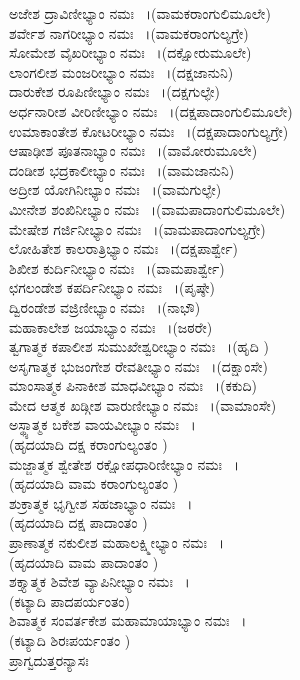   ಅಜೇಶ ದ್ರಾವಿಣೀಭ್ಯಾಂ ನಮಃ  ~।(ವಾಮಕರಾಂಗುಲಿಮೂಲೇ)\\
  ಶರ್ವೇಶ ನಾಗರೀಭ್ಯಾಂ ನಮಃ  ~।(ವಾಮಕರಾಂಗುಲ್ಯಗ್ರೇ)\\
  ಸೋಮೇಶ ವೈಖರೀಭ್ಯಾಂ ನಮಃ  ~।(ದಕ್ಷೋರುಮೂಲೇ)\\
  ಲಾಂಗಲೀಶ ಮಂಜರೀಭ್ಯಾಂ ನಮಃ  ~।(ದಕ್ಷಜಾನುನಿ)\\
  ದಾರುಕೇಶ ರೂಪಿಣೀಭ್ಯಾಂ ನಮಃ  ~।(ದಕ್ಷಗುಲ್ಫೇ)\\
  ಅರ್ಧನಾರೀಶ ವೀರಿಣೀಭ್ಯಾಂ ನಮಃ  ~।(ದಕ್ಷಪಾದಾಂಗುಲಿಮೂಲೇ)\\
  ಉಮಾಕಾಂತೇಶ ಕೋಟರೀಭ್ಯಾಂ ನಮಃ  ~।(ದಕ್ಷಪಾದಾಂಗುಲ್ಯಗ್ರೇ)\\
  ಆಷಾಢೀಶ ಪೂತನಾಭ್ಯಾಂ ನಮಃ  ~।(ವಾಮೋರುಮೂಲೇ)\\
  ದಂಡೀಶ ಭದ್ರಕಾಲೀಭ್ಯಾಂ ನಮಃ  ~।(ವಾಮಜಾನುನಿ)\\
  ಅದ್ರೀಶ ಯೋಗಿನೀಭ್ಯಾಂ ನಮಃ  ~।(ವಾಮಗುಲ್ಫೇ)\\
  ಮೀನೇಶ ಶಂಖಿನೀಭ್ಯಾಂ ನಮಃ  ~।(ವಾಮಪಾದಾಂಗುಲಿಮೂಲೇ)\\
  ಮೇಷೇಶ ಗರ್ಜಿನೀಭ್ಯಾಂ ನಮಃ  ~।(ವಾಮಪಾದಾಂಗುಲ್ಯಗ್ರೇ)\\
  ಲೋಹಿತೇಶ ಕಾಲರಾತ್ರಿಭ್ಯಾಂ ನಮಃ  ~।(ದಕ್ಷಪಾರ್ಶ್ವೇ)\\
  ಶಿಖೀಶ ಕುರ್ದಿನೀಭ್ಯಾಂ ನಮಃ  ~।(ವಾಮಪಾರ್ಶ್ವೇ)\\
  ಛಗಲಂಡೇಶ ಕಪರ್ದಿನೀಭ್ಯಾಂ ನಮಃ  ~।(ಪೃಷ್ಠೇ)\\
  ದ್ವಿರಂಡೇಶ ವಜ್ರಿಣೀಭ್ಯಾಂ ನಮಃ  ~।(ನಾಭೌ)\\
  ಮಹಾಕಾಲೇಶ ಜಯಾಭ್ಯಾಂ ನಮಃ  ~।(ಜಠರೇ)\\
  ತ್ವಗಾತ್ಮಕ ಕಪಾಲೀಶ ಸುಮುಖೇಶ್ವರೀಭ್ಯಾಂ ನಮಃ  ~।(ಹೃದಿ )\\
  ಅಸೃಗಾತ್ಮಕ ಭುಜಂಗೇಶ ರೇವತೀಭ್ಯಾಂ ನಮಃ  ~।(ದಕ್ಷಾಂಸೇ)\\
  ಮಾಂಸಾತ್ಮಕ ಪಿನಾಕೀಶ ಮಾಧವೀಭ್ಯಾಂ ನಮಃ  ~।(ಕಕುದಿ)\\
  ಮೇದ ಆತ್ಮಕ ಖಡ್ಗೀಶ ವಾರುಣೀಭ್ಯಾಂ ನಮಃ  ~।(ವಾಮಾಂಸೇ)\\
  ಅಸ್ಥ್ಯಾತ್ಮಕ ಬಕೇಶ ವಾಯವೀಭ್ಯಾಂ ನಮಃ  ~।\\(ಹೃದಯಾದಿ ದಕ್ಷ ಕರಾಂಗುಲ್ಯಂತಂ )\\
  ಮಜ್ಜಾತ್ಮಕ ಶ್ವೇತೇಶ ರಕ್ಷೋಪಧಾರಿಣೀಭ್ಯಾಂ ನಮಃ  ~।\\(ಹೃದಯಾದಿ ವಾಮ ಕರಾಂಗುಲ್ಯಂತಂ )\\
  ಶುಕ್ರಾತ್ಮಕ ಭೃಗ್ವೀಶ ಸಹಜಾಭ್ಯಾಂ ನಮಃ  ~।\\(ಹೃದಯಾದಿ ದಕ್ಷ ಪಾದಾಂತಂ )\\
  ಪ್ರಾಣಾತ್ಮಕ ನಕುಲೀಶ ಮಹಾಲಕ್ಷ್ಮೀಭ್ಯಾಂ ನಮಃ  ~।\\(ಹೃದಯಾದಿ ವಾಮ ಪಾದಾಂತಂ )\\
  ಶಕ್ತ್ಯಾತ್ಮಕ ಶಿವೇಶ ವ್ಯಾಪಿನೀಭ್ಯಾಂ ನಮಃ  ~।\\(ಕಟ್ಯಾದಿ ಪಾದಪರ್ಯಂತಂ)\\
 ಶಿವಾತ್ಮಕ ಸಂವರ್ತಕೇಶ ಮಹಾಮಾಯಾಭ್ಯಾಂ ನಮಃ  ~।\\(ಕಟ್ಯಾದಿ ಶಿರಃಪರ್ಯಂತಂ )\\
ಪ್ರಾಗ್ವದುತ್ತರನ್ಯಾಸಃ
